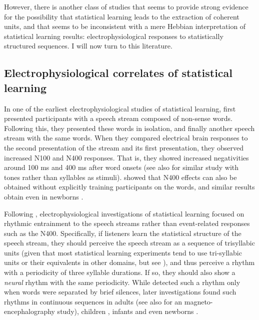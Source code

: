 \documentclass[
]{article}
\begin{document}
However, there is another class of studies that seems to provide strong
evidence for the possibility that statistical learning leads to the
extraction of coherent units, and that seems to be inconsistent with a
mere Hebbian interpretation of statistical learning results:
electrophysiological responses to statistically structured sequences. I
will now turn to this literature.

\hypertarget{electrophysiological-correlates-of-statistical-learning}{%
\subsection{Electrophysiological correlates of statistical
learning}\label{electrophysiological-correlates-of-statistical-learning}}

In one of the earliest electrophysiological studies of statistical
learning, \citep{Sanders2002} first presented participants with a speech
stream composed of non-sense words. Following this, they presented these
words in isolation, and finally another speech stream with the same
words. When they compared electrical brain responses to the second
presentation of the stream and its first presentation, they observed
increased N100 and N400 responses. That is, they showed increased
negativities around 100 ms and 400 ms after word onsets (see also
\citep{Abla2008} for similar study with tones rather than syllables as
stimuli). \citep{Cunillera2006} showed that N400 effects can also be
obtained without explicitly training participants on the words, and
similar results obtain even in newborns \citep{Kudo2011, Teinonen2009}.

Following \citep{Buiatti2009}, electrophysiological investigations of
statistical learning focused on rhythmic entrainment to the speech
streams rather than event-related responses such as the N400.
Specifically, if listeners learn the statistical structure of the speech
stream, they should perceive the speech stream as a sequence of
trisyllabic units (given that most statistical learning experiments tend
to use tri-syllabic units or their equivalents in other domains, but see
\citep{Johnson2010}), and thus perceive a rhythm with a periodicity of
three syllable durations. If so, they should also show a \emph{neural}
rhythm with the same periodicity. While \citep{Buiatti2009} detected
such a rhythm only when words were separated by brief silences, later
investigations found such rhythms in continuous sequences in adults
\citep{Batterink2017} (see also \citep{Moser2021} for an
magneto-encephalography study), children \citep{Moreau2022}, infants
\citep{Kabdebon2015} and even newborns \citep{Flo2022}.
\end{document}
